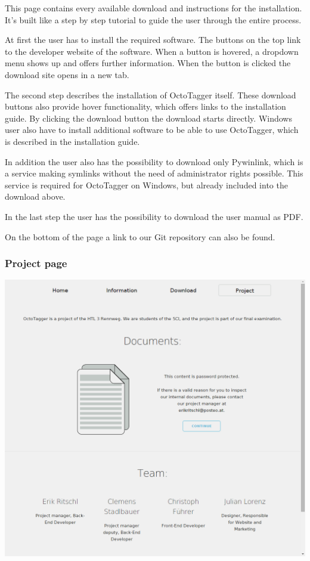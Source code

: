 This page contains every available download and instructions for the installation. It's built like a step by step tutorial to guide the user through the entire process.

At first the user has to install the required software. The buttons on the top link to the developer website of the software. When a button is hovered, a dropdown menu shows up and offers further information. When the button is clicked the download site opens in a new tab.
 
The second step describes the installation of OctoTagger itself. These download buttons also provide hover functionality, which offers links to the installation guide. By clicking the download button the download starts directly. Windows user also have to install additional software to be able to use OctoTagger, which is described in the installation guide. 

In addition the user also has the possibility to download only Pywinlink, which is a service making symlinks without the need of administrator rights possible. This service is required for OctoTagger on Windows, but already included into the download above.

In the last step the user has the possibility to download the user manual as PDF.

On the bottom of the page a link to our Git repository can also be found.

\subsubsection{Project page}

\begin{center}
\includegraphics[scale=0.35]{images/project_full.png}
\end{center}

